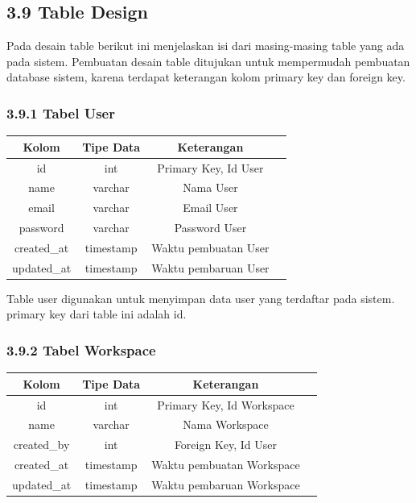 \subsection*{3.9 Table Design}
Pada desain table berikut ini menjelaskan isi dari masing-masing table yang ada pada sistem. 
Pembuatan desain table ditujukan untuk mempermudah pembuatan database sistem, karena terdapat keterangan kolom primary key dan foreign key.

\subsubsection*{3.9.1	Tabel User}
\begin{center}
  \begin{tabular}{|c|c|c|c|}
    \hline
    \textbf{Kolom} & \textbf{Tipe Data} & \textbf{Keterangan} \\
    \hline
    id & int & Primary Key, Id User \\
    name & varchar & Nama User \\
    email & varchar & Email User \\ 
    password & varchar & Password User \\
    created\_at & timestamp & Waktu pembuatan User \\
    updated\_at & timestamp & Waktu pembaruan User \\
    \hline
  \end{tabular}
\end{center}

Table user digunakan untuk menyimpan data user yang terdaftar pada sistem. primary key dari table ini adalah id.

\subsubsection*{3.9.2	Tabel Workspace}
\begin{center}
  \begin{tabular}{|c|c|c|c|}
    \hline
    \textbf{Kolom} & \textbf{Tipe Data} & \textbf{Keterangan} \\
    \hline
    id & int & Primary Key, Id Workspace \\
    name & varchar & Nama Workspace \\
    created\_by & int & Foreign Key, Id User \\
    created\_at & timestamp & Waktu pembuatan Workspace \\
    updated\_at & timestamp & Waktu pembaruan Workspace \\
    \hline
  \end{tabular}
\end{center}

